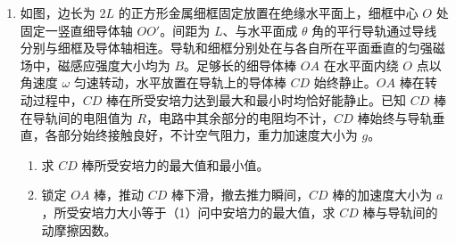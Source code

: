 \documentclass[\gkver]{gaokaozhenti}
\begin{document}
\begin{enumerate}
{$A$ 到 $B$ 过程根据动能定理得 $qU - mgL = \frac{1}{2}mv_{B}^{2} - \frac{1}{2}mv_{A}^{2}$

联立解得 $v_{A} = \sqrt{\frac{qU - mgL}{m}}$，$v_{B} = \sqrt{\frac{3(qU - mgL)}{m}}$
}

\item
如图，边长为 $2L$ 的正方形金属细框固定放置在绝缘水平面上，细框中心 $O$ 处固定一竖直细导体轴 $OO'$。间距为 $L$、与水平面成 $\theta$ 角的平行导轨通过导线分别与细框及导体轴相连。导轨和细框分别处在与各自所在平面垂直的匀强磁场中，磁感应强度大小均为 $B$。足够长的细导体棒 $OA$ 在水平面内绕 $O$ 点以角速度 $\omega$ 匀速转动，水平放置在导轨上的导体棒 $CD$ 始终静止。$OA$ 棒在转动过程中，$CD$ 棒在所受安培力达到最大和最小时均恰好能静止。已知 $CD$ 棒在导轨间的电阻值为 $R$，电路中其余部分的电阻均不计，$CD$ 棒始终与导轨垂直，各部分始终接触良好，不计空气阻力，重力加速度大小为 $g$。
\begin{enumerate}
	\item
	求 $CD$ 棒所受安培力的最大值和最小值。
	\item
	锁定 $OA$ 棒，推动 $CD$ 棒下滑，撤去推力瞬间，$CD$ 棒的加速度大小为 $a$，所受安培力大小等于（1）问中安培力的最大值，求 $CD$ 棒与导轨间的动摩擦因数。
\end{enumerate}

\end{enumerate}
\end{document}

